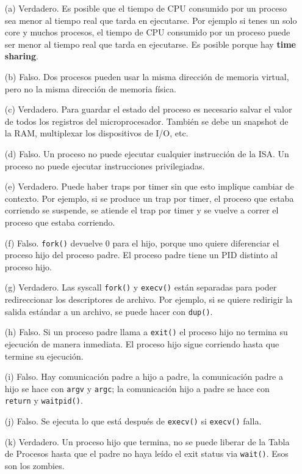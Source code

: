 \documentclass[12pt]{article}
\begin{document}
\begin{rta}
    \begin{itemize}
        \item[(a)] Verdadero. Es posible que el tiempo de CPU consumido por un proceso sea menor al tiempo real que tarda en ejecutarse. Por ejemplo si tenes un solo core y muchos procesos, el tiempo de CPU consumido por un proceso puede ser menor al tiempo real que tarda en ejecutarse. Es posible porque hay \textbf{time sharing}.
        \item[(b)] Falso. Dos procesos pueden usar la misma dirección de memoria virtual, pero no la misma dirección de memoria física.
        \item[(c)] Verdadero. Para guardar el estado del proceso es necesario salvar el valor de todos los registros del microprocesador. También se debe un snapshot de la RAM, multiplexar los dispositivos de I/O, etc.
        \item[(d)] Falso. Un proceso no puede ejecutar cualquier instrucción de la ISA. Un proceso no puede ejecutar instrucciones privilegiadas.
        \item[(e)] Verdadero. Puede haber traps por timer sin que esto implique cambiar de contexto. Por ejemplo, si se produce un trap por timer, el proceso que estaba corriendo se suspende, se atiende el trap por timer y se vuelve a correr el proceso que estaba corriendo.
        \item[(f)] Falso. \texttt{fork()} devuelve 0 para el hijo, porque uno quiere diferenciar el proceso hijo del proceso padre. El proceso padre tiene un PID distinto al proceso hijo.
        \item[(g)] Verdadero. Las syscall \texttt{fork()} y \texttt{execv()} están separadas para poder redireccionar los descriptores de archivo. Por ejemplo, si se quiere redirigir la salida estándar a un archivo, se puede hacer con \texttt{dup()}.
        \item[(h)] Falso. Si un proceso padre llama a \texttt{exit()} el proceso hijo no termina su ejecución de manera inmediata. El proceso hijo sigue corriendo hasta que termine su ejecución.
        \item[(i)] Falso. Hay comunicación padre a hijo a padre, la comunicación padre a hijo se hace con \texttt{argv} y \texttt{argc}; la comunicación hijo a padre se hace con \texttt{return} y \texttt{waitpid()}.
        \item[(j)] Falso. Se ejecuta lo que está después de \texttt{execv()} si \texttt{execv()} falla.
        \item[(k)] Verdadero. Un proceso hijo que termina, no se puede liberar de la Tabla de Procesos hasta que el padre no haya leído el exit status via \texttt{wait()}. Esos son los zombies.
    \end{itemize}
\end{rta}
\end{document}
